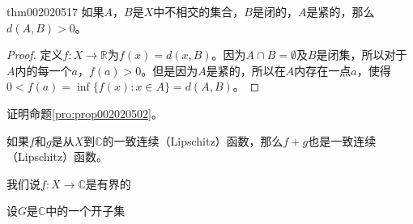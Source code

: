 \begin{theorem}{}{thm002020517}
如果$A$，$B$是$X$中不相交的集合，$B$是闭的，$A$是紧的，那么$d(A, B) > 0$。
\end{theorem}

\begin{proof}
定义$f: X \to \mathbb{R}$为$f(x) = d(x, B)$。因为$A \cap B = \emptyset$及$B$是闭集，所以对于$A$内的每一个$a$，$f(a) > 0$。但是因为$A$是紧的，所以在$A$内存在一点$a$，使得$0 < f(a) = \inf\{f(x): x \in A\} = d(A, B)$。
\end{proof}

\begin{exercise}
证明命题\ref{pro:prop002020502}。
\end{exercise}

\begin{exercise}
如果$f$和$g$是从$X$到$\mathbb{C}$的一致连续（Lipschitz）函数，那么$f+g$也是一致连续（Lipschitz）函数。
\end{exercise}

\begin{exercise}\label{exer002020503}
我们说$f:X \to \mathbb{C}$是有界的
\end{exercise}



\begin{exercise}\label{exer002020507}
设$G$是$\mathbb{C}$中的一个开子集
\end{exercise}





